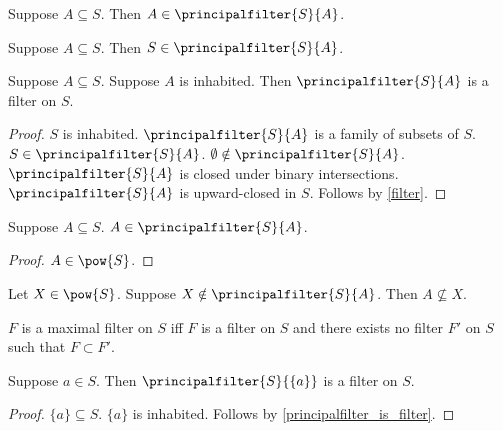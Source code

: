 \begin{proposition}\label{principalfilter_bottom}
    Suppose $A\subseteq S$.
    Then $A\in\principalfilter{S}{A}$.
\end{proposition}

\begin{proposition}\label{principalfilter_top}
    Suppose $A\subseteq S$.
    Then $S\in\principalfilter{S}{A}$.
\end{proposition}

\begin{proposition}\label{principalfilter_is_filter}
    Suppose $A\subseteq S$.
    Suppose $A$ is inhabited.
    Then $\principalfilter{S}{A}$ is a filter on $S$.
\end{proposition}
\begin{proof}
    $S$ is inhabited. %
    $\principalfilter{S}{A}$ is a family of subsets of $S$.
    $S\in \principalfilter{S}{A}$.
    $\emptyset\notin \principalfilter{S}{A}$.
    $\principalfilter{S}{A}$ is closed under binary intersections.
    $\principalfilter{S}{A}$ is upward-closed in $S$.
    Follows by \cref{filter}.
\end{proof}

\begin{proposition}\label{principalfilter_elem_generator}
    Suppose $A\subseteq S$.
    $A\in\principalfilter{S}{A}$.
\end{proposition}
\begin{proof}
    $A\in\pow{S}$.
\end{proof}

\begin{proposition}\label{principalfilter_notelem_implies_notsupseteq}
    Let $X\in\pow{S}$.
    Suppose $X\notin\principalfilter{S}{A}$.
    Then $A\not\subseteq X$.
\end{proposition}

\begin{definition}\label{maximalfilter}
    $F$ is a maximal filter on $S$ iff
    $F$ is a filter on $S$ and there exists no filter $F'$ on $S$ such that $F\subset F'$.
\end{definition}

\begin{proposition}\label{principalfilter_singleton_is_filter}
    Suppose $a\in S$.
    Then $\principalfilter{S}{\{a\}}$ is a filter on $S$.
\end{proposition}
\begin{proof}
    $\{a\}\subseteq S$.
    $\{a\}$ is inhabited.
    Follows by \cref{principalfilter_is_filter}.
\end{proof}

